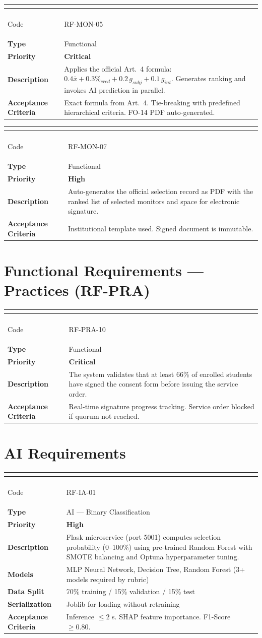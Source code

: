 \documentclass[12pt,a4paper,twoside]{report}
\newenvironment{reqenv}[2]{%
  \begin{longtable}{|>{\columncolor{rowGray}\bfseries\small}p{3.8cm}|>{\small}p{10.5cm}|}
  \hline
  \multicolumn{2}{|>{\columncolor{tableHdr}}c|}{\textcolor{white}{\textbf{#1 — #2}}} \\
  \hline \endfirsthead
  \hline
  \multicolumn{2}{|>{\columncolor{tableHdr}}c|}{\textcolor{white}{\textbf{#1 — #2 (Cont.)}}} \\
  \hline \endhead \hline
}{%
  \end{longtable}
}
\newcommand{\reqrow}[2]{#1 & #2 \\[2pt] \hline}
\begin{document}
\begin{reqenv}{RF-MON-05}{Automated Scoring Algorithm (Acuerdo 012/2023)}
\reqrow{Code}{RF-MON-05}
\reqrow{Type}{Functional}
\reqrow{Priority}{\textcolor{uscoRed}{\textbf{Critical}}}
\reqrow{Description}{Applies the official Art.~4 formula: $0.4\bar{x}+0.3\%_{cred}+0.2\,g_{subj}+0.1\,g_{int}$. Generates ranking and invokes AI prediction in parallel.}
\reqrow{Acceptance Criteria}{Exact formula from Art.~4. Tie-breaking with predefined hierarchical criteria. FO-14 PDF auto-generated.}
\end{reqenv}

\begin{reqenv}{RF-MON-07}{FO-14 Digital Record Generation}
\reqrow{Code}{RF-MON-07}
\reqrow{Type}{Functional}
\reqrow{Priority}{\textcolor{uscoRed}{\textbf{High}}}
\reqrow{Description}{Auto-generates the official selection record as PDF with the ranked list of selected monitors and space for electronic signature.}
\reqrow{Acceptance Criteria}{Institutional template used. Signed document is immutable.}
\end{reqenv}

\section{Functional Requirements — Practices (RF-PRA)}

\begin{reqenv}{RF-PRA-10}{66\% Quorum Verification}
\reqrow{Code}{RF-PRA-10}
\reqrow{Type}{Functional}
\reqrow{Priority}{\textcolor{uscoRed}{\textbf{Critical}}}
\reqrow{Description}{The system validates that at least 66\% of enrolled students have signed the consent form before issuing the service order.}
\reqrow{Acceptance Criteria}{Real-time signature progress tracking. Service order blocked if quorum not reached.}
\end{reqenv}

\section{AI Requirements}

\begin{reqenv}{RF-IA-01}{ML Ensemble Prediction}
\reqrow{Code}{RF-IA-01}
\reqrow{Type}{AI — Binary Classification}
\reqrow{Priority}{\textcolor{uscoRed}{\textbf{High}}}
\reqrow{Description}{Flask microservice (port 5001) computes selection probability (0--100\%) using pre-trained Random Forest with SMOTE balancing and Optuna hyperparameter tuning.}
\reqrow{Models}{MLP Neural Network, Decision Tree, Random Forest (3+ models required by rubric)}
\reqrow{Data Split}{70\% training / 15\% validation / 15\% test}
\reqrow{Serialization}{Joblib for loading without retraining}
\reqrow{Acceptance Criteria}{Inference $\leq 2$ s. SHAP feature importance. F1-Score $\geq 0.80$.}
\end{reqenv}
\end{document}
